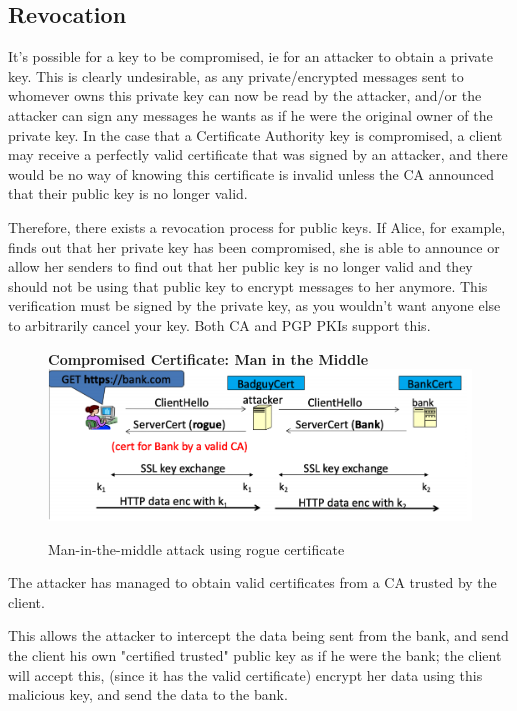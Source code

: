 \documentclass[11pt]{article} %
\begin{document}
\subsection{Revocation}
It's possible for a key to be compromised, ie for an attacker to obtain a 
private key. This is clearly undesirable, as any private/encrypted messages 
sent to whomever owns this private key can now be read by the attacker, and/or 
the attacker can sign any messages he wants as if he were the original owner of
the private key. In the case that a Certificate Authority key is compromised, a
client may receive a perfectly valid certificate that was signed by an attacker,
and there would be no way of knowing this certificate is invalid unless the CA 
announced that their public key is no longer valid.

\bigskip
Therefore, there exists a revocation process for public keys. If Alice, for 
example, finds out that her private key has been compromised, she is able to 
announce or allow her senders to find out that her public key is no longer valid
and they should not be using that public key to encrypt messages to her anymore.
This verification must be signed by the private key, as you wouldn't want anyone
else to arbitrarily cancel your key. Both CA and PGP PKIs support this. 

\begin{figure}
    \centering
    \textbf{Compromised Certificate: Man in the Middle}
    \includegraphics[scale=.4]{./cert3.png}
    \caption{Man-in-the-middle attack using rogue certificate}

\end{figure}

\bigskip
{\parindent0pt The attacker has managed to obtain valid certificates from a CA 
trusted by the client.}

\bigskip
{\parindent0pt This allows the attacker to intercept the data being sent from the
bank, and send the client his own "certified trusted" public key as if 
he were the bank; the client will accept this, (since it has the valid 
certificate) encrypt her data using this malicious key, and send the 
data to the bank.}
\end{document}
